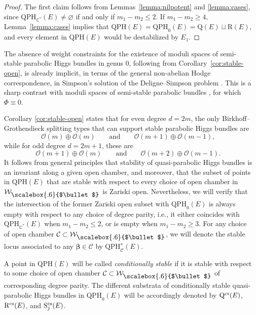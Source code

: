 \documentclass[pdftex]{sigma}
\newcommand{\field}[1]{\ensuremath{\mathbb{#1}}}
\newcommand{\CC}{\field{C}}
\newcommand{\calO}{\mathcal{O}}
\newcommand\sbul[1][.6]{\mathbin{\vcenter{\hbox{\scalebox{#1}{$\bullet$}}}}}
\newcommand{\qC}{\mathcal{C}}
\newcommand{\qW}{\mathcal{W}}
\numberwithin{equation}{section}
\begin{document}
\begin{proof}
The first claim follows from Lemmas~\ref{lemma:nilpotent} and \ref{lemma:cases}, since $\mathrm{QPH}_{\CC^{*}}(E)\neq\varnothing $ if and only if $m_{1}-m_{2}\leq 2$. If $m_{1}-m_{2} \geq 4$, Lemma~\ref{lemma:cases} implies that $\mathrm{QPH}(E) = \mathrm{QPH}_{0}(E) = \mathrm{Q}(E)\sqcup \mathrm{R}(E)$, and every element in $\mathrm{QPH}(E)$ would be destabilized by $E_{1}$.
\end{proof}

\begin{Remark}%
The absence of weight constraints for the existence of moduli spaces of semi-stable parabolic Higgs bundles in genus 0, following from Corollary~\ref{cor:stable-open}, is already implicit, in terms of the general non-abelian Hodge correspondence, in Simpson's solution of the Deligne--Simpson problem \cite{Sim92}. This is a sharp contrast with moduli spaces of semi-stable parabolic bundles \cite{Bau91, Bis98}, for which $\Phi\equiv 0$.
\end{Remark}

Corollary \ref{cor:stable-open} states that for even degree $d=2m$, the only Birkhoff--Grothendieck splitting types that can support stable parabolic Higgs bundles are
\[
\calO(m)\oplus \calO(m) \qquad\text{and}\qquad \calO(m+1)\oplus\calO(m-1),
\]
while for odd degree $d=2m+1$, these are
\[
\calO(m+1)\oplus \calO(m)\qquad\text{and}\qquad \calO(m+2)\oplus\calO(m-1).
\]
It follows from general principles that stability of quasi-parabolic Higgs bundles is an invariant along a given open chamber, and moreover, that the subset of points in $\mathrm{QPH}(E)$ that are stable with respect to every choice of open chamber in $\qW_{\sbul}$ is Zariski open. Nevertheless, we will verify that the intersection of the former Zariski open subset with $\mathrm{QPH}_{0}(E)$ is always empty with respect to any choice of degree parity, i.e., it either coincides with $\mathrm{QPH}_{\CC^{*}}(E)$ when $m_{1}-m_{2}\leq 2$, or is empty when $m_{1}-m_{2}\geq 3$. For any choice of open chamber $\qC\subset\qW_{\sbul}$, we will denote the stable locus associated to any $\pmb{\beta}\in\qC$ by $\mathrm{QPH}^{s}_{\qC}(E)$.


\begin{Definition}\label{def:cond-stab}
A point in $\mathrm{QPH}(E)$ will be called \textit{conditionally stable} if it is stable with respect to some choice of open chamber $\qC\subset\qW_{\sbul}$ of corresponding degree parity. The different substrata of conditionally stable quasi-parabolic Higgs bundles in $\mathrm{QPH}_{0}(E)$ will be accordingly denoted by $\mathrm{Q}^{\rm cs}(E)$, $\mathrm{R}^{\rm cs}(E)$, and $\mathrm{S}^{\rm cs}_{j}(E)$.
\end{Definition}
\end{document}
